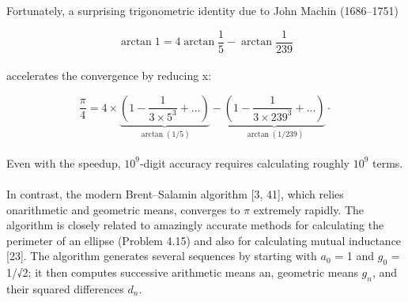 \documentclass{book}
\begin{document}
\pagestyle{fancy} 

 
\renewcommand{\headrulewidth}{0pt}
\fancyhf{} 


\noindent\Large \textrm{Fortunately, a surprising trigonometric identity due to John Machin (1686–1751)}

\begin {equation}\label{formula4.21}
\arctan1=4\arctan\frac{1}{5}-\arctan\frac{1}{239}
 \end{equation}
\\
\Large \textrm{accelerates the convergence by reducing x:}

\begin {equation}\label{formula4.22}
\frac{\pi}{4}=4\times\underbrace{(1-\frac{1}{3\times 5^{3}}+\dots)}_{\arctan(1/5)}-\underbrace{(1-\frac{1}{3\times 239^{3}}+\dots)}_{\arctan(1/239)}\cdot
\end{equation}
\\
\noindent \Large \textrm{ Even with the speedup, $10^{9}$-digit accuracy requires calculating roughly $10^{9}$ terms.}\\
\\
\noindent\Large \textrm{ In contrast, the modern Brent–Salamin algorithm [3, 41], which relies onarithmetic and geometric means, converges to $\pi$ extremely rapidly. The
algorithm is closely related to amazingly accurate methods for calculating
the perimeter of an ellipse (Problem 4.15) and also for calculating mutual
inductance [23]. The algorithm generates several sequences by starting
with $a_{0}$ = 1 and $g_{0}$ = 1/√2; it then computes successive arithmetic means
an, geometric means $g_{n}$, and their squared differences $d_{n}$.}
\end{document}
